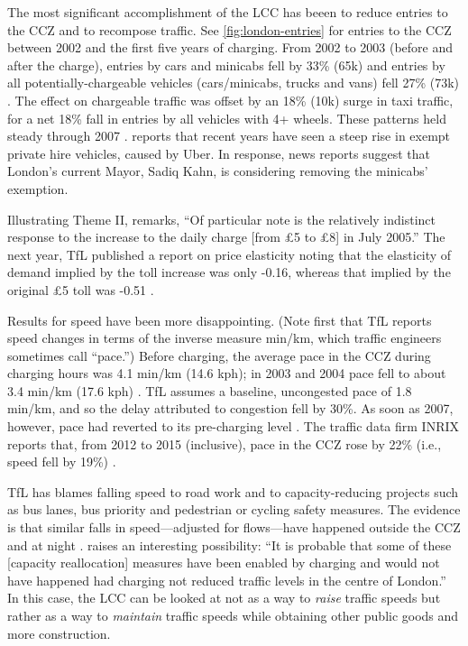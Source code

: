 The most significant accomplishment of the LCC has beeen to reduce entries to the CCZ and to recompose traffic. See  \ref{fig:london-entries} for entries to the CCZ between 2002 and the first five years of charging. From 2002 to 2003 (before and after the charge), entries by cars and minicabs fell by 33\% (65k) and entries by all potentially-chargeable vehicles (cars/minicabs, trucks and vans) fell 27\% (73k) \citep[p. 22, Tab. 2.2]{TfLFifth2007}. The effect on chargeable traffic was offset by an 18\% (10k) surge in taxi traffic, for a net 18\% fall in entries by all vehicles with 4+ wheels. These patterns held steady through 2007 \citet[p. 41, Tab. 3.1]{TfLSixth2008}. \citet{TfL2017} reports that recent years have seen a steep rise in exempt private hire vehicles, caused by Uber. In response, news reports suggest that London's current Mayor, Sadiq Kahn, is considering removing the minicabs' exemption.



Illustrating Theme II, \citet[p. 19]{TfLFifth2007} remarks, ``Of particular note is the relatively indistinct response to the increase to the daily charge [from \pounds 5 to \pounds 8] in July 2005.'' The next year, TfL published a report on price elasticity noting that the elasticity of demand implied by the toll increase was only -0.16, whereas that implied by the original \pounds 5 toll was -0.51 \citep{TfLDemand2008}.

Results for speed have been more disappointing. (Note first that TfL reports speed changes in terms of the inverse measure min/km, which traffic engineers sometimes call ``pace.'') Before charging, the average pace in the CCZ during charging hours was 4.1 min/km (14.6 kph); in 2003 and 2004 pace fell to about 3.4 min/km (17.6 kph) \citep[Sec. 3.4]{TfLFifth2007}. TfL assumes a baseline, uncongested pace of 1.8 min/km, and so the delay attributed to congestion fell by 30\%. As soon as 2007, however, pace had reverted to its pre-charging level \citep[Sec. 4.4]{TfLSixth2008}. The traffic data firm INRIX reports that, from 2012 to 2015 (inclusive), pace in the CCZ rose by 22\% (i.e., speed fell by 19\%) \citep{INRIX2016}.

TfL has blames falling speed to road work and to capacity-reducing projects such as bus lanes, bus priority and pedestrian or cycling safety measures. The evidence is that similar falls in speed---adjusted for flows---have happened outside the CCZ and at night \citep[Sec. 3.11]{TfLFifth2007}. \citet[p.3]{TfLExPost2007} raises an interesting possibility: ``It is probable that some of these [capacity reallocation] measures have been enabled by charging and would not have happened had charging not reduced traffic levels in the centre of London.'' In this case, the LCC can be looked at not as a way to \emph{raise} traffic speeds but rather as a way to \emph{maintain} traffic speeds while obtaining other public goods and more construction. 

